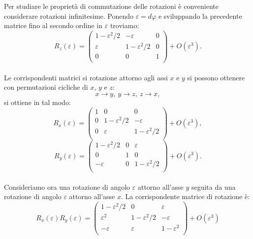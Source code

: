 Per studiare le proprietà di commutazione delle rotazioni è conveniente considerare rotazioni infinitesime. Ponendo $\varepsilon =d\varphi$ e sviluppando la precedente matrice fino al secondo ordine in $\varepsilon$ troviamo:
	\begin{equation}
		R_z (\varepsilon)=
		\begin{pmatrix}
			1-\varepsilon ^2 /2 & -\varepsilon & 0\\
			\varepsilon & 1-\varepsilon ^2/2 & 0 \\
			0 & 0 & 1 \\
		\end{pmatrix}
		+ O(\varepsilon ^3).
	\end{equation}\\
	
Le corrispondenti matrici si rotazione attorno agli assi $x$ e $y$ si possono ottenere con permutazioni cicliche di $x$, $y$ e $z$:
	\begin{equation}
		x\rightarrow y,\ y\rightarrow z,\ z\rightarrow x,
	\end{equation}
si ottiene in tal modo:
	\begin{equation}
		R_x (\varepsilon)=
		\begin{pmatrix}
			1 & 0 & 0\\
			0 & 1-\varepsilon ^2/2 & -\varepsilon \\
			0 & \varepsilon & 1-\varepsilon ^2/2 \\
		\end{pmatrix}
		+ O(\varepsilon ^3),
	\end{equation}
	\begin{equation}
		R_y (\varepsilon)=
		\begin{pmatrix}
			1-\varepsilon ^2/2 & 0 & \varepsilon\\
			0 & 1 &0 \\
			- \varepsilon & 0 & 1-\varepsilon ^2/2 \\
		\end{pmatrix}
		+ O(\varepsilon ^3).
	\end{equation}\\
	
Consideriamo ora una rotazione di angolo $\varepsilon$ attorno all'asse $y$ seguita da una rotazione di angolo $\varepsilon$ attorno all'asse $x$. La corrispondente matrice di rotazione è:
	\begin{equation}
		R_x (\varepsilon)R_y (\varepsilon)=
		\begin{pmatrix}
			1-\varepsilon ^2/2 & 0 & \varepsilon \\
			 \varepsilon ^2 & 1-\varepsilon ^2/2 & -\varepsilon \\
			-  \varepsilon & \varepsilon & 1-\varepsilon ^2 \\
		\end{pmatrix}
		+ O(\varepsilon ^3)
	\end{equation}\\
	
